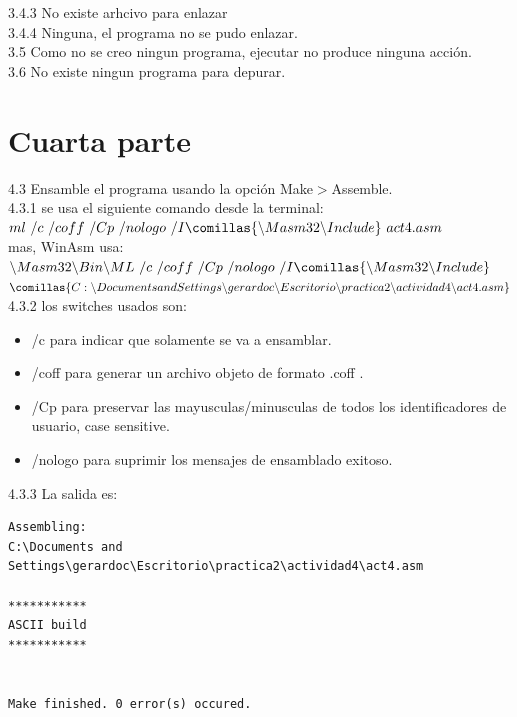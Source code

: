 \large{3.4.3} No existe arhcivo para enlazar\\

\large{3.4.4} Ninguna, el programa no se pudo enlazar.\\

\large{3.5} Como no se creo ningun programa, ejecutar no produce ninguna acción.\\

\large{3.6} No existe ningun programa para depurar.\\




\section{Cuarta parte}
\large{4.3} Ensamble el programa usando la opción Make$>$Assemble.\\

\large{4.3.1} se usa el siguiente comando desde la terminal:\\
 $ml \  /c\  /coff\  /Cp\  /nologo\ /I\comillas{\backslash Masm32\backslash Include}\ act4.asm$ \\
 mas, WinAsm usa: \\
 $\backslash Masm32\backslash Bin\backslash ML \  /c\  /coff\  /Cp\  /nologo\ /I\comillas{\backslash Masm32\backslash Include}$\\$ \comillas{C:\backslash Documents and Settings\backslash gerardoc\backslash Escritorio\backslash practica2\backslash actividad4\backslash act4.asm}$\\


\large{4.3.2} los switches usados son: 
\begin{itemize}
 \item /c para indicar que solamente se va a ensamblar.
 \item /coff para generar un archivo objeto de formato .coff .
 \item /Cp para preservar las mayusculas/minusculas de todos los identificadores de usuario, case sensitive.
 \item /nologo  para suprimir los mensajes de ensamblado exitoso.
\end{itemize}


\large{4.3.3} La salida es:
\begin{verbatim}
Assembling: 
C:\Documents and Settings\gerardoc\Escritorio\practica2\actividad4\act4.asm

***********
ASCII build
***********


Make finished. 0 error(s) occured.


\end{verbatim}

